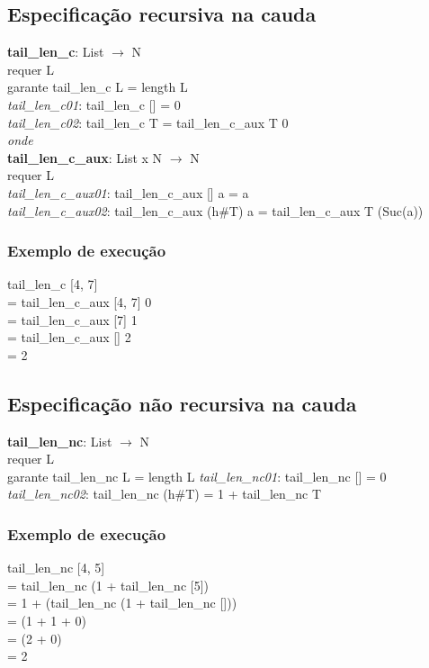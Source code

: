 \documentclass{article}
\begin{document}
\subsection{Especificação recursiva na cauda}
\textbf{tail\_len\_c}: List $\rightarrow$ N
\\requer L
\\garante tail\_len\_c L = length L
\\\textit{tail\_len\_c01}: tail\_len\_c [] = 0
\\\textit{tail\_len\_c02}: tail\_len\_c T = tail\_len\_c\_aux T 0
\\\textit{onde}
\\
\textbf{tail\_len\_c\_aux}: List x N $\rightarrow$ N
\\requer L
\\\textit{tail\_len\_c\_aux01}: tail\_len\_c\_aux [] a = a
\\\textit{tail\_len\_c\_aux02}: tail\_len\_c\_aux (h\#T) a = tail\_len\_c\_aux T (Suc(a))

\subsubsection{Exemplo de execução}
tail\_len\_c [4, 7]
\\= tail\_len\_c\_aux [4, 7] 0
\\= tail\_len\_c\_aux [7] 1
\\= tail\_len\_c\_aux [] 2
\\= 2

\subsection{Especificação não recursiva na cauda}
\textbf{tail\_len\_nc}: List $\rightarrow$ N
\\requer L
\\garante tail\_len\_nc L = length L
\textit{tail\_len\_nc01}: tail\_len\_nc [] = 0
\textit{tail\_len\_nc02}: tail\_len\_nc (h\#T) = 1 + tail\_len\_nc T

\subsubsection{Exemplo de execução}
tail\_len\_nc [4, 5]
\\= tail\_len\_nc (1 + tail\_len\_nc [5])
\\= 1 + (tail\_len\_nc (1 + tail\_len\_nc []))
\\= (1 + 1 + 0)
\\= (2 + 0)
\\= 2
\end{document}
